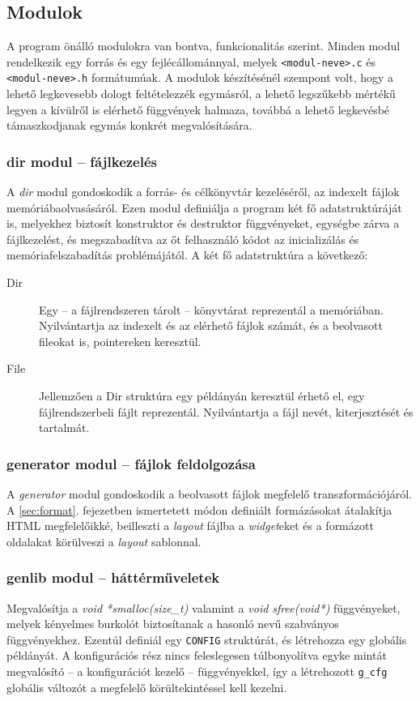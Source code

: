 \documentclass[a4paper,10pt]{article}
\begin{document}
\subsection{Modulok}
A program önálló modulokra van bontva, funkcionalitás szerint. Minden modul rendelkezik egy forrás és egy fejlécállománnyal, melyek \texttt{<modul-neve>.c} és \texttt{<modul-neve>.h} formátumúak. A modulok készítésénél szempont volt, hogy a lehető legkevesebb dologt feltételezzék egymásról, a lehető legszűkebb mértékű legyen a kívülről is elérhető függvények halmaza, továbbá a lehető legkevésbé támaszkodjanak egymás konkrét megvalósítására.
\subsubsection{dir modul -- fájlkezelés}
A \emph{dir} modul gondoskodik a forrás- és célkönyvtár kezeléséről, az indexelt fájlok memóriábaolvasásáról. Ezen modul definiálja a program két fő adatstruktúráját is, melyekhez biztosít konstruktor és destruktor függvényeket, egységbe zárva a fájlkezelést, és megszabadítva az őt felhasználó kódot az inicializálás és memóriafelszabadítás problémájától.
A két fő adatstruktúra a következő:

\begin{description}
	\item[Dir] Egy -- a fájlrendszeren tárolt -- könyvtárat reprezentál a memóriában. Nyilvántartja az indexelt és az elérhető fájlok számát, és a beolvasott fileokat is, pointereken keresztül.
	\item[File] Jellemzően a Dir struktúra egy példányán keresztül érhető el, egy fájlrendszerbeli fájlt reprezentál. Nyilvántartja a fájl nevét, kiterjesztését és tartalmát.
\end{description}

\subsubsection{generator modul -- fájlok feldolgozása}
A \emph{generator} modul gondoskodik a beolvasott fájlok megfelelő transzformációjáról. A \ref{sec:format}. fejezetben ismertetett módon definiált formázásokat átalakítja HTML megfelelőikké, beilleszti a \emph{layout} fájlba a \emph{widget}eket és a formázott oldalakat körülveszi a \emph{layout} sablonnal.

\subsubsection{genlib modul -- háttérműveletek}
Megvalósítja a \emph{void *smalloc(size\_t)} valamint a \emph{void sfree(void*)} függvényeket, melyek kényelmes burkolót biztosítanak a hasonló nevű szabványos függvényekhez. Ezentúl definiál egy \texttt{CONFIG} struktúrát, és létrehozza egy globális példányát. A konfigurációs rész nincs feleslegesen túlbonyolítva egyke mintát megvalósító -- a konfigurációt kezelő -- függvényekkel, így a létrehozott \texttt{g\_cfg} globális változót a megfelelő körültekintéssel kell kezelni.
\end{document}
